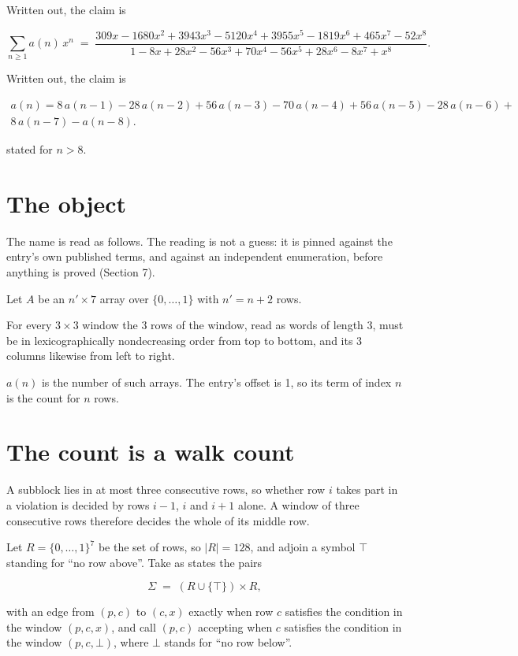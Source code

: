 \documentclass[11pt]{article}
\theoremstyle{definition}
\begin{document}
Written out, the claim is

\[\sum_{n \ge 1} a(n)\,x^n \;=\; \frac{309x - 1680x^{2} + 3943x^{3} - 5120x^{4} + 3955x^{5} - 1819x^{6} + 465x^{7} - 52x^{8}}{1 - 8x + 28x^{2} - 56x^{3} + 70x^{4} - 56x^{5} + 28x^{6} - 8x^{7} + x^{8}}.\]

Written out, the claim is

\begin{multline*} a(n) = 8\,a(n-1) - 28\,a(n-2) + 56\,a(n-3) - 70\,a(n-4) + 56\,a(n-5) - 28\,a(n-6) + \\ 8\,a(n-7) - a(n-8). \end{multline*}

stated for $n > 8$.

\section{The object}

The name is read as follows. The reading is not a guess: it is pinned against the entry's own published terms, and against an independent enumeration, before anything is proved (Section 7).

Let $A$ be an $n' \times 7$ array over $\{0,\dots,1\}$ with $n' = n + 2$ rows.

For every $3\times3$ window the $3$ rows of the window, read as words of length $3$, must be in lexicographically nondecreasing order from top to bottom, and its $3$ columns likewise from left to right.

$a(n)$ is the number of such arrays. The entry's offset is 1, so its term of index $n$ is the count for $n$ rows.

\section{The count is a walk count}

A subblock lies in at most three consecutive rows, so whether row $i$ takes part in a violation is decided by rows $i-1$, $i$ and $i+1$ alone. A window of three consecutive rows therefore decides the whole of its middle row.

Let $R = \{0,\dots,1\}^{7}$ be the set of rows, so $|R| = 128$, and adjoin a symbol $\top$ standing for ``no row above''. Take as states the pairs

\[\Sigma \;=\; (R \cup \{\top\}) \times R,\]

with an edge from $(p,c)$ to $(c,x)$ exactly when row $c$ satisfies the condition in the window $(p,c,x)$, and call $(p,c)$ accepting when $c$ satisfies the condition in the window $(p,c,\bot)$, where $\bot$ stands for ``no row below''.
\end{document}
